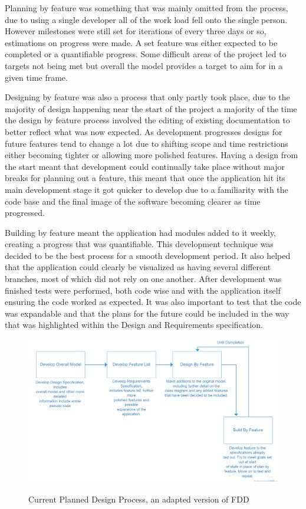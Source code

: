 Planning by feature was something that was mainly omitted from the process, due to using a single developer all of the work load fell onto the single person. However milestones were still set for iterations of every three days or so, estimations on progress were made. A set feature was either expected to be completed or a quantifiable progress. Some difficult areas of the project led to targets not being met but overall the model provides a target to aim for in a given time frame. 

Designing by feature was also a process that only partly took place, due to the majority of design happening near the start of the project a majority of the time the design by feature process involved the editing of existing documentation to better reflect what was now expected. As development progresses designs for future features tend to change a lot due to shifting scope and time restrictions either becoming tighter or allowing more polished features. Having a design from the start meant that development could continually take place without major breaks for planning out a feature, this meant that once the application hit its main development stage it got quicker to develop due to a familiarity with the code base and the final image of the software becoming clearer as time progressed. 

 Building by feature meant the application had modules added to it weekly, creating a progress that was quantifiable. This development technique was decided to be the best process for a smooth development period. It also helped that the application could clearly be visualized as having several different branches, most of which did not rely on one another. After development was finished tests were performed, both code wise and with the application itself ensuring the code worked as expected. It was also important to test that the code was expandable and that the plans for the future could be included in the way that was highlighted within the Design and Requirements specification. \\
\begin{figure}[h]
\includegraphics[scale=0.18]{Chapter1/process.png}\\
 \caption[Design Process]{Current Planned Design Process, an adapted version of FDD}
\end{figure}

